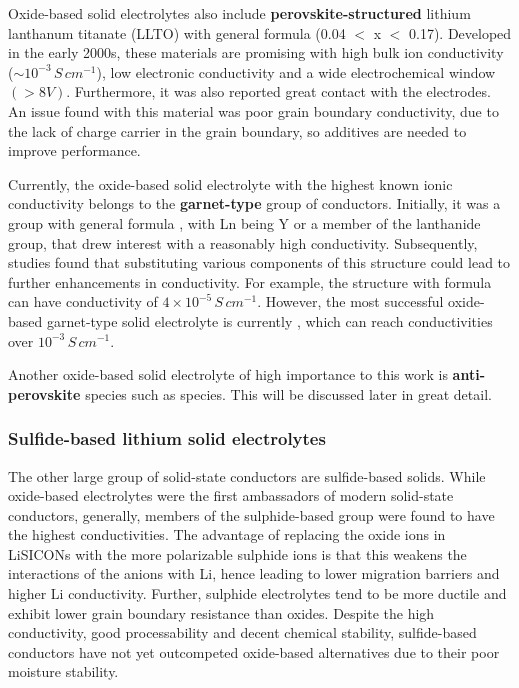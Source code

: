 \documentclass[10pt,a4paper, titlepage]{article}
\begin{document}
Oxide-based solid electrolytes also include \textbf{perovskite-structured} lithium lanthanum titanate (LLTO) with general formula  (0.04 $<$ x $<$ 0.17). 
Developed in the early 2000s, these materials are promising with high bulk ion conductivity ($\sim 10^{-3} \, S \, cm^{-1}$), low electronic conductivity and a wide electrochemical window $(> 8 V)$. Furthermore, it was also reported great contact with the electrodes. \cite{RN18}
An issue found with this material was poor grain boundary conductivity, due to the lack of charge carrier  in the grain boundary\cite{RN6}, so additives are needed to improve performance. 

Currently, the oxide-based solid electrolyte with the highest known ionic conductivity belongs to the \textbf{garnet-type} group of conductors. 
Initially, it was a group with general formula , with Ln being Y or a member of the lanthanide group, that drew interest with a reasonably high conductivity. \cite{RN22}
Subsequently, studies found that substituting various components of this structure could lead to further enhancements in conductivity.
For example, the structure with formula  can have conductivity of $4 \times 10^{-5} \, S \, cm^{-1}$. \cite{RN23}
However, the most successful oxide-based garnet-type solid electrolyte is currently , which can reach conductivities over $10^{-3} \, S \, cm^{-1}$. \cite{RN85}

Another oxide-based solid electrolyte of high importance to this work is \textbf{anti-perovskite} species such as  species. 
This will be discussed later in great detail. 



\subsubsection{Sulfide-based lithium solid electrolytes}

The other large group of solid-state conductors are sulfide-based solids.
While oxide-based electrolytes were the first ambassadors of modern solid-state conductors, generally, members of the sulphide-based group were found to have the highest conductivities.
The advantage of replacing the oxide ions in LiSICONs with the more polarizable sulphide ions is that this weakens the interactions of the anions with Li, hence leading to lower migration barriers and higher Li conductivity. 
Further, sulphide electrolytes tend to be more ductile and exhibit lower grain boundary resistance than oxides. 
Despite the high conductivity, good processability and decent chemical stability, sulfide-based conductors have not yet outcompeted oxide-based alternatives due to their poor moisture stability.
\end{document}
